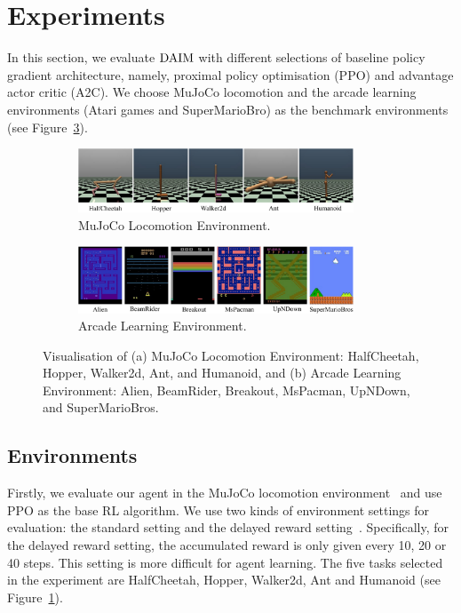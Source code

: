 \section{Experiments}
In this section, we evaluate $\text{DAIM}$ with different selections of baseline policy gradient architecture, namely, proximal policy optimisation (PPO) and advantage actor critic (A2C). We choose MuJoCo locomotion and the arcade learning environments (Atari games and SuperMarioBro) as the benchmark environments (see Figure~\ref{fig:ch5_envs}). 
\begin{figure}[h]
    \begin{subfigure}{\textwidth}
        \centering
        \includegraphics[width=0.9\textwidth]{figures/chapter5/mujoco_env.pdf}
        \caption{MuJoCo Locomotion Environment.}
        \label{fig:mujoco_env}
    \end{subfigure}
    \begin{subfigure}{\textwidth}
        \centering
        \includegraphics[width=0.9\textwidth]{figures/chapter5/atari_env.pdf}
        \caption{Arcade Learning Environment.}
        \label{fig:ale_env}
    \end{subfigure}
    \caption{Visualisation of (a) MuJoCo Locomotion Environment: HalfCheetah, Hopper, Walker2d, Ant, and Humanoid, and (b) Arcade Learning Environment: Alien, BeamRider, Breakout, MsPacman, UpNDown, and SuperMarioBros.}
    \label{fig:ch5_envs}
\end{figure}

\subsection{Environments}
Firstly, we evaluate our agent in the MuJoCo locomotion environment~\cite{duan2016benchmarking} and use PPO as the base RL algorithm. We use two kinds of environment settings for evaluation: the standard setting and the delayed reward setting~\cite{zheng2018learning}. Specifically, {for the delayed reward setting}, the accumulated reward is only given every 10, 20 or 40 steps. This setting is more difficult for agent learning. The five tasks selected in the experiment are HalfCheetah, Hopper, Walker2d, Ant and Humanoid (see Figure~\ref{fig:mujoco_env}).

